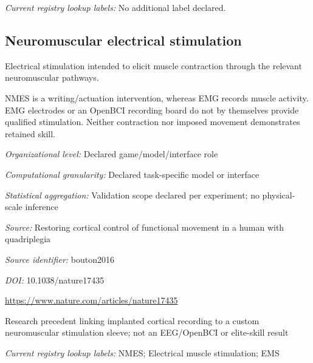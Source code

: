\noindent\textit{Current registry lookup labels:} No additional label declared.\par

\begin{samepage}
\subsection*{Neuromuscular electrical stimulation}
\noindent Electrical stimulation intended to elicit muscle contraction through the relevant neuromuscular pathways.\par
\end{samepage}
\noindent NMES is a writing/actuation intervention, whereas EMG records muscle activity. EMG electrodes or an OpenBCI recording board do not by themselves provide qualified stimulation. Neither contraction nor imposed movement demonstrates retained skill.\par
\noindent\textit{Organizational level:} Declared game/model/interface role\par
\noindent\textit{Computational granularity:} Declared task-specific model or interface\par
\begin{samepage}
\noindent\textit{Statistical aggregation:} Validation scope declared per experiment; no physical-scale inference\par\nopagebreak[4]

\end{samepage}
\noindent\textit{Source:} Restoring cortical control of functional movement in a human with quadriplegia\par
\noindent\textit{Source identifier:} bouton2016\par
\noindent\textit{DOI:} 10.1038/nature17435\par
\noindent\url{https://www.nature.com/articles/nature17435}\par
\noindent Research precedent linking implanted cortical recording to a custom neuromuscular stimulation sleeve; not an EEG/OpenBCI or elite-skill result\par


\noindent\textit{Current registry lookup labels:} NMES; Electrical muscle stimulation; EMS\par

